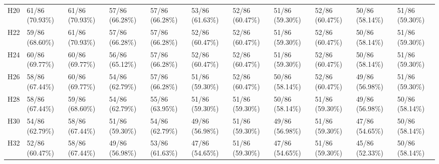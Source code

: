 \begin{table}[tbp]
\begin{tabular}{lllllllllll}
H20 & 61/86 (70.93\%) & 61/86 (70.93\%) & 57/86 (66.28\%) & 57/86 (66.28\%) & 53/86 (61.63\%) & 52/86 (60.47\%) & 51/86 (59.30\%) & 52/86 (60.47\%) & 50/86 (58.14\%) & 51/86 (59.30\%) \\
H22 & 59/86 (68.60\%) & 61/86 (70.93\%) & 57/86 (66.28\%) & 57/86 (66.28\%) & 52/86 (60.47\%) & 52/86 (60.47\%) & 51/86 (59.30\%) & 52/86 (60.47\%) & 50/86 (58.14\%) & 51/86 (59.30\%) \\
H24 & 60/86 (69.77\%) & 60/86 (69.77\%) & 56/86 (65.12\%) & 57/86 (66.28\%) & 52/86 (60.47\%) & 52/86 (60.47\%) & 51/86 (59.30\%) & 52/86 (60.47\%) & 50/86 (58.14\%) & 51/86 (59.30\%) \\
H26 & 58/86 (67.44\%) & 60/86 (69.77\%) & 54/86 (62.79\%) & 57/86 (66.28\%) & 51/86 (59.30\%) & 52/86 (60.47\%) & 50/86 (58.14\%) & 52/86 (60.47\%) & 49/86 (56.98\%) & 51/86 (59.30\%) \\
H28 & 58/86 (67.44\%) & 59/86 (68.60\%) & 54/86 (62.79\%) & 55/86 (63.95\%) & 51/86 (59.30\%) & 51/86 (59.30\%) & 50/86 (58.14\%) & 51/86 (59.30\%) & 49/86 (56.98\%) & 50/86 (58.14\%) \\
H30 & 54/86 (62.79\%) & 58/86 (67.44\%) & 51/86 (59.30\%) & 54/86 (62.79\%) & 49/86 (56.98\%) & 51/86 (59.30\%) & 49/86 (56.98\%) & 51/86 (59.30\%) & 47/86 (54.65\%) & 50/86 (58.14\%) \\
H32 & 52/86 (60.47\%) & 58/86 (67.44\%) & 49/86 (56.98\%) & 53/86 (61.63\%) & 47/86 (54.65\%) & 51/86 (59.30\%) & 47/86 (54.65\%) & 51/86 (59.30\%) & 45/86 (52.33\%) & 50/86 (58.14\%) \\
\bottomrule
\end{tabular}
\end{table}
